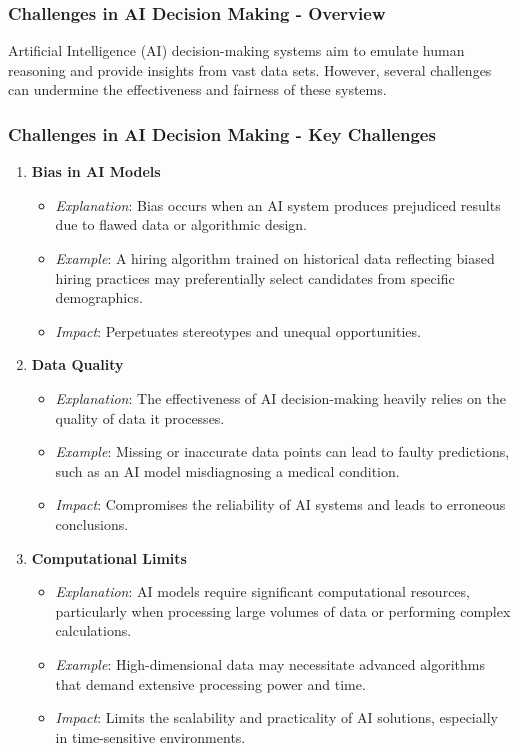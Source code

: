 \documentclass[aspectratio=169]{beamer}
\begin{document}
\begin{frame}[fragile]
    \frametitle{Challenges in AI Decision Making - Overview}
    Artificial Intelligence (AI) decision-making systems aim to emulate human reasoning and provide insights from vast data sets. However, several challenges can undermine the effectiveness and fairness of these systems.
\end{frame}

\begin{frame}[fragile]
    \frametitle{Challenges in AI Decision Making - Key Challenges}
    \begin{enumerate}
        \item \textbf{Bias in AI Models}
        \begin{itemize}
            \item \textit{Explanation}: Bias occurs when an AI system produces prejudiced results due to flawed data or algorithmic design.
            \item \textit{Example}: A hiring algorithm trained on historical data reflecting biased hiring practices may preferentially select candidates from specific demographics.
            \item \textit{Impact}: Perpetuates stereotypes and unequal opportunities.
        \end{itemize}

        \item \textbf{Data Quality}
        \begin{itemize}
            \item \textit{Explanation}: The effectiveness of AI decision-making heavily relies on the quality of data it processes.
            \item \textit{Example}: Missing or inaccurate data points can lead to faulty predictions, such as an AI model misdiagnosing a medical condition.
            \item \textit{Impact}: Compromises the reliability of AI systems and leads to erroneous conclusions.
        \end{itemize}

        \item \textbf{Computational Limits}
        \begin{itemize}
            \item \textit{Explanation}: AI models require significant computational resources, particularly when processing large volumes of data or performing complex calculations.
            \item \textit{Example}: High-dimensional data may necessitate advanced algorithms that demand extensive processing power and time.
            \item \textit{Impact}: Limits the scalability and practicality of AI solutions, especially in time-sensitive environments.
        \end{itemize}
    \end{enumerate}
\end{frame}
\end{document}
